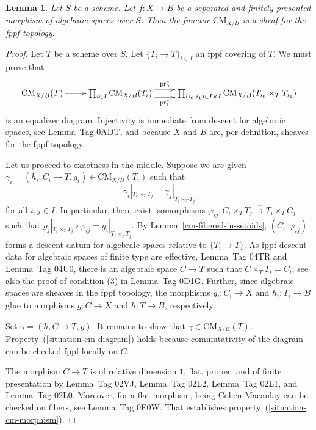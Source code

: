 \documentclass{stacks-project}
\theoremstyle{plain}
\newtheorem{lemma}[subsection]{Lemma}
\theoremstyle{definition}
\theoremstyle{remark}
\numberwithin{equation}{subsection}
\def\CMfunctor{\mathcal{C}\!{\it oh}}
\def\CMfunctor{\text{CM}}
\begin{document}
\begin{lemma}
	Let $S$ be a scheme.
Let $f \colon X \to B$ be a separated and finitely presented morphism of algebraic spaces over $S$.
Then the functor $\CMfunctor_{X/B}$ is a sheaf for the fppf topology.
	\label{cm-is-sheaf}
\end{lemma}

\begin{proof}
Let $T$ be a scheme over $S$.
Let $\{ T_i \to T \}_{i \in I}$ an fppf covering of $T$.
We must prove that
\[ \xymatrix{
  \CMfunctor_{X/B}(T) \ar[r] & \prod\nolimits_{i\in I} \CMfunctor_{X/B}(T_i) \ar@<1ex>[r]^-{\text{pr}_0^*} \ar@<-1ex>[r]_-{\text{pr}_1^*} & \prod\nolimits_{(i_0, i_1) \in I \times I} \CMfunctor_{X/B}(T_{i_0} \times_T T_{i_1})
} \]
is an equalizer diagram.
Injectivity is immediate from descent for algebraic spaces, see Lemma~Tag 0ADT, and because $X$ and $B$ are, per definition, sheaves for the fppf topology.

Let us proceed to exactness in the middle.
Suppose we are given $\gamma_i = (h_i,C_i \to T,g_i) \in \CMfunctor_{X/B}(T_i)$ such that 
\[ \gamma_i|_{T_i \times_T T_j} = \gamma_j|_{T_i \times_T T_j} \]
for all $i,j \in I$.
In particular, there exist isomorphisms $\varphi_{ij} \colon C_i \times_T T_j \xrightarrow{\sim} T_i \times_T C_j$ such that $g_j|_{T_i \times_T T_j} \circ \varphi_{ij} = g_i|_{T_i \times_T T_j}$.
By Lemma~\ref{cm-fibered-in-setoids}, $(C_i,\varphi_{ij})$ forms a descent datum for algebraic spaces relative to $\{T_i \to T\}$.
As fppf descent data for algebraic spaces of finite type are effective, Lemma~Tag 04TR and Lemma~Tag 04U0, there is an algebraic space $C \to T$ such that $C \times_T T_i = C_i$; see also the proof of condition (3) in Lemma~Tag 0D1G.
Further, since algebraic spaces are sheaves in the fppf topology, the morphisms $g_i \colon C_i \to X$ and $h_i \colon T_i \to B$ glue to morphisms $g \colon C \to X$ and $h \colon T \to B$, respectively.

Set $\gamma = (h,C\to T,g)$.
It remains to show that $\gamma \in \CMfunctor_{X/B}(T)$.
Property~(\ref{situation-cm-diagram}) holds because commutativity of the diagram can be checked fppf locally on $C$.

The morphism $C \to T$ is of relative dimension $1$, flat, proper, and of finite presentation by Lemma~Tag 02VJ, Lemma~Tag 02L2, Lemma~Tag 02L1, and Lemma~Tag 02L0.
Moreover, for a flat morphism, being Cohen-Macaulay can be checked on fibers, see Lemma~Tag 0E0W. That establishes property~(\ref{situation-cm-morphism}).


\end{proof}
\end{document}

